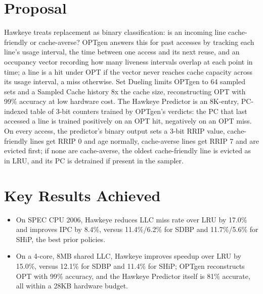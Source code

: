 \documentclass[10pt, conference]{IEEEtran}
\begin{document}
\section{Proposal}
Hawkeye treats replacement as binary classification: is an incoming line cache-friendly or cache-averse? OPTgen answers this for past accesses by tracking each line's usage interval, the time between one access and its next reuse, and an occupancy vector recording how many liveness intervals overlap at each point in time; a line is a hit under OPT if the vector never reaches cache capacity across its usage interval, a miss otherwise. Set Dueling limits OPTgen to 64 sampled sets and a Sampled Cache history 8x the cache size, reconstructing OPT with 99\% accuracy at low hardware cost. The Hawkeye Predictor is an 8K-entry, PC-indexed table of 3-bit counters trained by OPTgen's verdicts: the PC that last accessed a line is trained positively on an OPT hit, negatively on an OPT miss. On every access, the predictor's binary output sets a 3-bit RRIP value, cache-friendly lines get RRIP 0 and age normally, cache-averse lines get RRIP 7 and are evicted first; if none are cache-averse, the oldest cache-friendly line is evicted as in LRU, and its PC is detrained if present in the sampler.

\section{Key Results Achieved}
\begin{itemize}[leftmargin=*, itemsep=2pt, topsep=2pt, parsep=1pt]
    \item On SPEC CPU 2006, Hawkeye reduces LLC miss rate over LRU by 17.0\% and improves IPC by 8.4\%, versus 11.4\%/6.2\% for SDBP and 11.7\%/5.6\% for SHiP, the best prior policies.
    \item On a 4-core, 8MB shared LLC, Hawkeye improves speedup over LRU by 15.0\%, versus 12.1\% for SDBP and 11.4\% for SHiP; OPTgen reconstructs OPT with 99\% accuracy, and the Hawkeye Predictor itself is 81\% accurate, all within a 28KB hardware budget.
\end{itemize}

\end{document}
